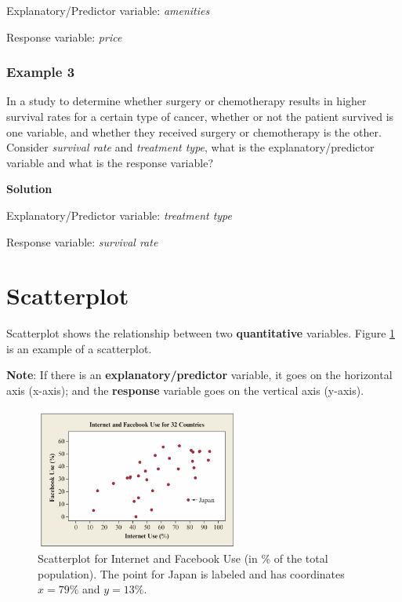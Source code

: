 \vspace{0.2cm}

\noindent Explanatory/Predictor variable: \textit{amenities}

\noindent Response variable: \textit{price} 

\subsubsection*{Example 3}
In a study to determine whether surgery or chemotherapy results in higher survival rates for a certain type of cancer, whether or not the patient survived is one variable, and whether they received surgery or chemotherapy is the other. Consider \textit{survival rate} and \textit{treatment type}, what is the explanatory/predictor variable and what is the response variable?  

\vspace{0.2cm}

\textbf{Solution}

\vspace{0.2cm}

\noindent Explanatory/Predictor variable: \textit{treatment type}

\noindent Response variable: \textit{survival rate} 


\section{Scatterplot}
Scatterplot shows the relationship between two \textbf{quantitative} variables. Figure \ref{fig:scatterplot.jpg} is an example of a scatterplot.

\vspace{0.2cm}

\noindent \textbf{Note}: If there is an \textbf{explanatory/predictor} variable, it goes on the horizontal axis (x-axis); and the \textbf{response} variable goes on the vertical axis (y-axis). 

\begin{figure}[h!]
\centering
\includegraphics[width=0.6\textwidth]{figures/scatterplot.jpg}
\caption{Scatterplot for Internet and Facebook Use (in \% of the total population). The point for Japan is labeled and has coordinates \(x=79\%\) and \(y=13\%.\)}
\label{fig:scatterplot.jpg}
\end{figure}

